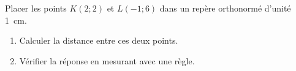 
\begin{exercice}\label{exoSeconde-0008}

    Placer les points \( K(2;2)\) et \( L(-1;6)\) dans un repère orthonormé d'unité \SI{1}{\centi\meter}. 
    \begin{enumerate}
        \item
            Calculer la distance entre ces deux points.
        \item
            Vérifier la réponse en mesurant avec une règle.
    \end{enumerate}

\end{exercice}
